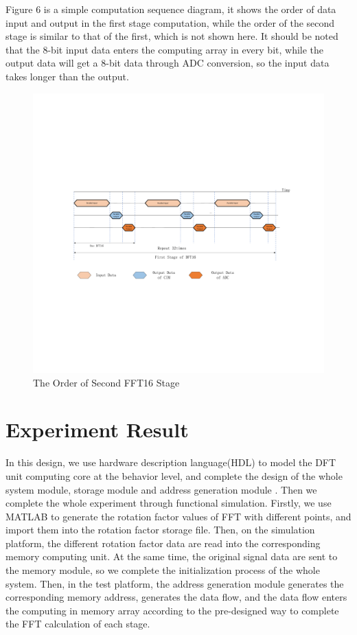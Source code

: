 \documentclass[journal]{IEEEtran}
\begin{document}
Figure 6 is a simple computation sequence diagram, it shows the order of data input and output in the first stage computation, while the order of the second stage is similar to that of the first, which is not shown here. It should be noted that the 8-bit input data enters the computing array in every bit, while the output data will get a 8-bit data through ADC conversion, so the input data takes longer than the output.

\begin{figure}[h]
\centering
\includegraphics[scale=0.2]{figures/figure6.pdf}
\caption{The Order of Second FFT16 Stage}
\end{figure}

\section{Experiment Result}
In this design, we use hardware description language(HDL) to model the DFT unit computing core at the behavior level, and complete the design of the whole system module, storage module and address generation module \cite{3}. Then we complete the whole experiment through functional simulation. Firstly, we use MATLAB to generate the rotation factor values of FFT with different points, and import them into the rotation factor storage file. Then, on the simulation platform, the different rotation factor data are read into the corresponding memory computing unit. At the same time, the original signal data are sent to the memory module, so we complete the initialization process of the whole system. Then, in the test platform, the address generation module generates the corresponding memory address, generates the data flow, and the data flow enters the computing in memory array according to the pre-designed way to complete the FFT calculation of each stage.
\end{document}
